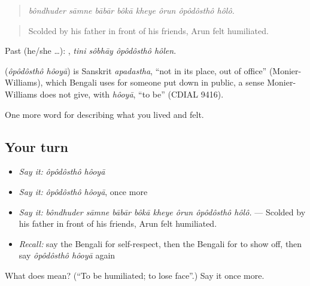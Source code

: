 \begin{quote}
\emph{bôndhuder sāmne bābār bôkā kheye ôrun ôpôdôsthô hôlô.}
\end{quote}

\begin{quote}
Scolded by his father in front of his friends, Arun felt humiliated.
\end{quote}

Past (he/she …):    , \emph{tini sôbhāy ôpôdôsthô hôlen}.

\begin{cousinweb}
\textbf{ } (\emph{ôpôdôsthô hôoyā}) is Sanskrit \emph{apadastha}, \textquotedblleft{}not in its place, out of office\textquotedblright{} (Monier-Williams), which Bengali uses for someone put down in public, a sense Monier-Williams does not give, with \emph{hôoyā}, \textquotedblleft{}to be\textquotedblright{} (CDIAL 9416).
\end{cousinweb}

\begin{grammarlens}[title={What you've built}]
One more word for describing what you lived and felt.
\end{grammarlens}

\subsection*{Your turn}
\begin{itemize}
\raggedright
  \item \emph{Say it:} \emph{ôpôdôsthô hôoyā}
  \item \emph{Say it:} \emph{ôpôdôsthô hôoyā}, once more
  \item \emph{Say it:} \emph{bôndhuder sāmne bābār bôkā kheye ôrun ôpôdôsthô hôlô.} — Scolded by his father in front of his friends, Arun felt humiliated.
  \item \emph{Recall:} say the Bengali for self-respect, then the Bengali for to show off, then say \emph{ôpôdôsthô hôoyā} again
\end{itemize}

\begin{tcolorbox}[breakable,colback=teal!4,colframe=teal!35!black,title={Before you move on}]
What does   mean? (\textquotedblleft{}To be humiliated; to lose face\textquotedblright{}.) Say it once more.
\end{tcolorbox}
